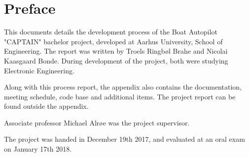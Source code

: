 \chapter{Preface}
This documents details the development process of the Boat Autopilot "CAPTAIN" bachelor project, developed at Aarhus University, School of Engineering. The report was written by Troels Ringbøl Brahe and Nicolai Kaasgaard Bonde. During development of the project, both were studying Electronic Engineering.

Along with this process report, the appendix also contains the documentation, meeting schedule, code base and additional items. The project report can be found outside the appendix.

Associate professor Michael Alrøe was the project supervisor.

The project was handed in December 19th 2017, and evaluated at an oral exam on January 17th 2018.